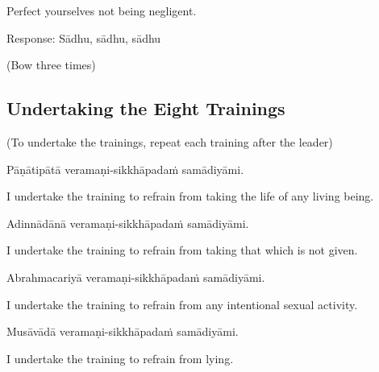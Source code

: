 \begin{english}
Perfect yourselves not being negligent.\\
\end{english}

Response: Sādhu, sādhu, sādhu\\

\begin{center}
(Bow three times)\\
\end{center}

\subsection{Undertaking the Eight Trainings}

\begin{center}
(To undertake the trainings, repeat each training after the leader)\\
\end{center}

Pāṇātipātā veramaṇi-sikkhāpadaṁ samādiyāmi.\\

\begin{english}
I undertake the training to refrain from taking the life of any living being.\\
\end{english}

Adinnādānā veramaṇi-sikkhāpadaṁ samādiyāmi.\\

\begin{english}
I undertake the training to refrain from taking that which is not given.\\
\end{english}

Abrahmacariyā veramaṇi-sikkhāpadaṁ samādiyāmi.\\

\begin{english}
I undertake the training to refrain from any intentional sexual activity.\\
\end{english}

Musāvādā veramaṇi-sikkhāpadaṁ samādiyāmi.\\

\begin{english}
I undertake the training to refrain from lying.\\
\end{english}

